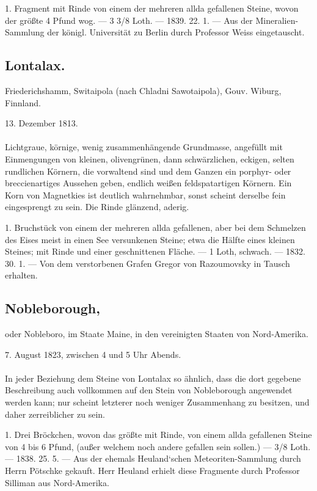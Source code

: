 \documentclass[a4paper, 11pt, oneside, polutonikogreek, german]{article}
\begin{document}
1. Fragment mit Rinde von einem der mehreren allda gefallenen Steine, wovon der größte 4 Pfund wog. — 3 3/8 Loth. — 1839. 22. 1. — Aus der Mineralien-Sammlung der königl. Universität zu Berlin durch Professor Weiss eingetauscht.
\subsection{Lontalax.}
\begin{center}
\small
Friederichshamm, Switaipola (nach Chladni Sawotaipola), Gouv. Wiburg, Finnland.

13. Dezember 1813.
\end{center}
\paragraph{}
Lichtgraue, körnige, wenig zusammenhängende Grundmasse, angefüllt mit Einmengungen von kleinen, olivengrünen, dann schwärzlichen, eckigen, selten rundlichen Körnern, die vorwaltend sind und dem Ganzen ein porphyr- oder breccienartiges Aussehen geben, endlich weißen feldspatartigen Körnern. Ein Korn von Magnetkies ist deutlich wahrnehmbar, sonst scheint derselbe fein eingesprengt zu sein. Die Rinde glänzend, aderig.

1. Bruchstück von einem der mehreren allda gefallenen, aber bei dem Schmelzen des Eises meist in einen See versunkenen Steine; etwa die Hälfte eines kleinen Steines; mit Rinde und einer geschnittenen Fläche. — 1 Loth, schwach. — 1832. 30. 1. — Von dem verstorbenen Grafen Gregor von Razoumovsky in Tausch erhalten.
\subsection[Nobleborough.]{Nobleborough,}
\begin{center}
\small
oder Nobleboro, im Staate Maine, in den vereinigten Staaten von Nord-Amerika.

7. August 1823, zwischen 4 und 5 Uhr Abends.
\end{center}
\paragraph{}
In jeder Beziehung dem Steine von Lontalax so ähnlich, dass die dort gegebene Beschreibung auch vollkommen auf den Stein von Nobleborough angewendet werden kann; nur scheint letzterer noch weniger Zusammenhang zu besitzen, und daher zerreiblicher zu sein.

1. Drei Bröckchen, wovon das größte mit Rinde, von einem allda gefallenen Steine von 4 bis 6 Pfund, (außer welchem noch andere gefallen sein sollen.) — 3/8 Loth. — 1838. 25. 5. — Aus der ehemals Heuland‘schen Meteoriten-Sammlung durch Herrn Pötschke gekauft. Herr Heuland erhielt diese Fragmente durch Professor Silliman aus Nord-Amerika.
\end{document}
